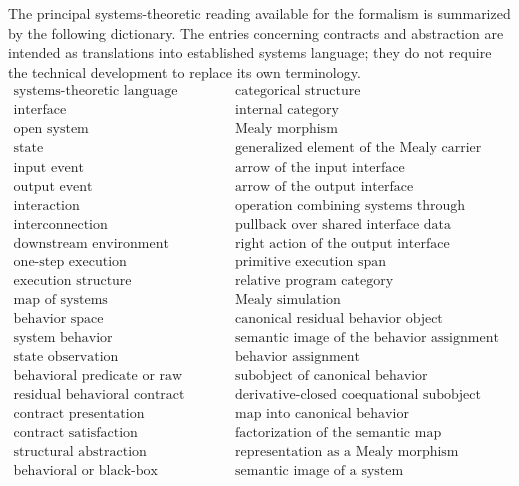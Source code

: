 The principal systems-theoretic reading available for the formalism is
summarized by the following dictionary.  The entries concerning contracts and
abstraction are intended as translations into established systems language;
they do not require the technical development to replace its own terminology.
\[
\begin{array}{c|c}
\text{systems-theoretic language}
&
\text{categorical structure}
\\
\hline
\text{interface}
&
\text{internal category}
\\
\text{open system}
&
\text{Mealy morphism}
\\
\text{state}
&
\text{generalized element of the Mealy carrier}
\\
\text{input event}
&
\text{arrow of the input interface}
\\
\text{output event}
&
\text{arrow of the output interface}
\\
\text{interaction}
&
\text{operation combining systems through interfaces}
\\
\text{interconnection}
&
\text{pullback over shared interface data}
\\
\text{downstream environment}
&
\text{right action of the output interface}
\\
\text{one-step execution}
&
\text{primitive execution span}
\\
\text{execution structure}
&
\text{relative program category}
\\
\text{map of systems}
&
\text{Mealy simulation}
\\
\text{behavior space}
&
\text{canonical residual behavior object}
\\
\text{system behavior}
&
\text{semantic image of the behavior assignment}
\\
\text{state observation}
&
\text{behavior assignment}
\\
\text{behavioral predicate or raw contract}
&
\text{subobject of canonical behavior}
\\
\text{residual behavioral contract}
&
\text{derivative-closed coequational subobject}
\\
\text{contract presentation}
&
\text{map into canonical behavior}
\\
\text{contract satisfaction}
&
\text{factorization of the semantic map}
\\
\text{structural abstraction}
&
\text{representation as a Mealy morphism}
\\
\text{behavioral or black-box abstraction}
&
\text{semantic image of a system}

\end{array}\]

